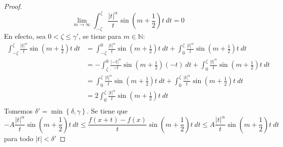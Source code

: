 \documentclass[12pt]{report}
\theoremstyle{largebreak}
\renewcommand{\leq}{\ensuremath{\leqslant}}
\newcommand\abs[1]{\ensuremath{\left|#1\right|}}
\begin{document}
\begin{proof}
\begin{equation*}
            \lim_{ m\rightarrow\infty}\int_{-\zeta}^{\zeta}\frac{\abs{t}^\alpha}{t}\sin\left(m+\frac{1}{2}\right)t\:dt=0
        \end{equation*}
        En efecto, sea $0<\zeta\leq\gamma'$, se tiene para $m\in\mathbb{N}$:
        \begin{equation*}
            \begin{split}
                \int_{-\zeta}^{\zeta}\frac{\abs{t}^\alpha}{t}\sin\left(m+\frac{1}{2}\right)t\:dt&=\int_{-\zeta}^{0}\frac{\abs{t}^\alpha}{t}\sin\left(m+\frac{1}{2}\right)t\:dt+\int_{0}^{\zeta}\frac{\abs{t}^\alpha}{t}\sin\left(m+\frac{1}{2}\right)t\:dt\\
                &=-\int_{\zeta}^{0}\frac{\abs{-t}^\alpha}{-t}\sin\left(m+\frac{1}{2}\right)(-t)\:dt+\int_{0}^{\zeta}\frac{\abs{t}^\alpha}{t}\sin\left(m+\frac{1}{2}\right)t\:dt\\
                &=\int_{0}^{\zeta}\frac{\abs{t}^\alpha}{t}\sin\left(m+\frac{1}{2}\right)t\:dt+\int_{0}^{\zeta}\frac{\abs{t}^\alpha}{t}\sin\left(m+\frac{1}{2}\right)t\:dt\\
                &=2\int_{0}^{\zeta}\frac{\abs{t}^\alpha}{t}\sin\left(m+\frac{1}{2}\right)t\:dt\\
            \end{split}
        \end{equation*}
        Tomemos $\delta'=\min\left\{\delta,\gamma\right\}$. Se tiene que
        \begin{equation*}
            -A\frac{\abs{t}^\alpha}{t}\sin\left(m+\frac{1}{2}\right)t\:dt \leq \frac{f(x+t)-f(x)}{t}\sin\left(m+\frac{1}{2}\right)t\:dt\leq A\frac{\abs{t}^\alpha}{t}\sin\left(m+\frac{1}{2}\right)t\:dt
        \end{equation*}
        para todo $\abs{t}<\delta'$
    \end{proof}
\end{document}
